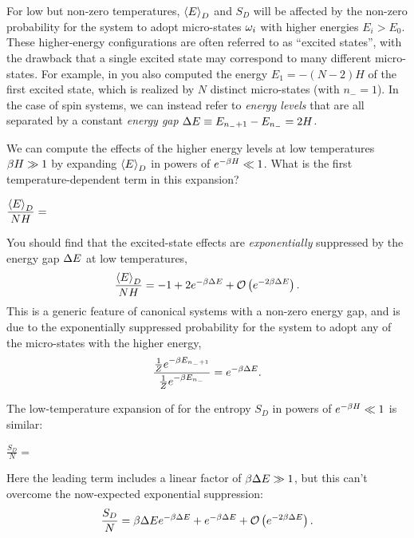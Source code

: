 For low but non-zero temperatures, $\left\langle E \right\rangle_D$ and $S_D$ will be affected by the non-zero probability for the system to adopt micro-states $\omega_i$ with higher energies $E_i > E_0$.
These higher-energy configurations are often referred to as ``excited states'', with the drawback that a single excited state may correspond to many different micro-states.
For example, in  you also computed the energy $E_1 = -(N - 2)H$ of the first excited state, which is realized by $N$ distinct micro-states (with $n_- = 1$).
In the case of spin systems, we can instead refer to \textit{energy levels} that are all separated by a constant \textit{energy gap} $\Delta E \equiv E_{n_- + 1} - E_{n_-} = 2H$.

\newpage %
We can compute the effects of the higher energy levels at low temperatures $\beta H \gg 1$ by expanding $\left\langle E \right\rangle_D$ in powers of $e^{-\beta H} \ll 1$.
What is the first temperature-dependent term in this expansion?
\begin{mdframed}
  $\displaystyle \frac{\left\langle E \right\rangle_D}{NH} = $ \\[100 pt]
\end{mdframed}
You should find that the excited-state effects are \textit{exponentially} suppressed by the energy gap $\Delta E$ at low temperatures,
\begin{equation*}
  \frac{\left\langle E \right\rangle_D}{NH} = -1 + 2e^{-\beta \Delta E} + \mathcal O\left(e^{-2\beta \Delta E}\right).
\end{equation*}
This is a generic feature of canonical systems with a non-zero energy gap, and is due to the exponentially suppressed probability for the system to adopt any of the micro-states with the higher energy,
\begin{equation*}
  \frac{\frac{1}{Z} e^{-\beta E_{n_- + 1}}}{\frac{1}{Z} e^{-\beta E_{n_-}}} = e^{-\beta \Delta E}.
\end{equation*}

The low-temperature expansion of  for the entropy $S_D$ in powers of $e^{-\beta H} \ll 1$ is similar:
\begin{mdframed}
  $\displaystyle \frac{S_D}{N} = $ \\[100 pt]
\end{mdframed}
Here the leading term includes a linear factor of $\beta \Delta E \gg 1$, but this can't overcome the now-expected exponential suppression:
\begin{equation*}
  \frac{S_D}{N} = \beta \Delta E e^{-\beta \Delta E} + e^{-\beta \Delta E} + \mathcal O\left(e^{-2\beta \Delta E}\right).
\end{equation*}

